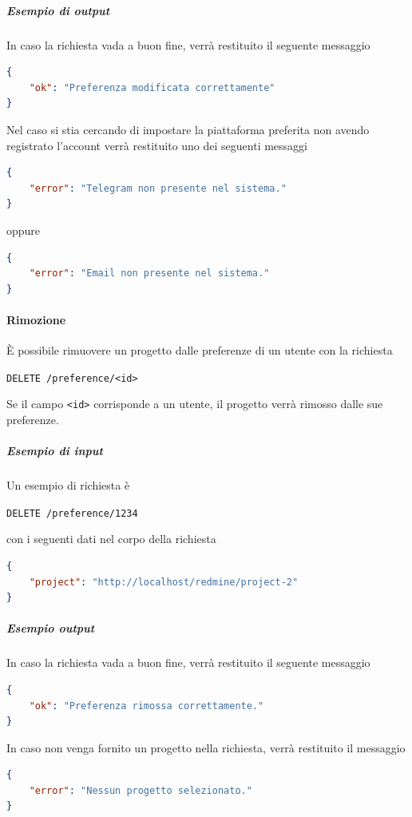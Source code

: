     \subparagraph{Esempio di output}
    In caso la richiesta vada a buon fine, verrà restituito il seguente messaggio
	\begin{lstlisting}[language = json]
{
    "ok": "Preferenza modificata correttamente"
}
	\end{lstlisting}

	Nel caso si stia cercando di impostare la piattaforma preferita non avendo registrato l'account verrà restituito uno dei seguenti messaggi
	\begin{lstlisting}[language = json]
{
    "error": "Telegram non presente nel sistema."
}
	\end{lstlisting}

	oppure

	\begin{lstlisting}[language = json]
{
    "error": "Email non presente nel sistema."
}
	\end{lstlisting}

\paragraph{Rimozione}

È possibile rimuovere un progetto dalle preferenze di un utente con la richiesta
\begin{center}
    \texttt{DELETE /preference/<id>}
\end{center}

Se il campo \texttt{<id>} corrisponde a un utente, il progetto verrà rimosso dalle sue preferenze.

    \subparagraph{Esempio di input}
    Un esempio di richiesta è
    \begin{center}
	    \texttt{DELETE /preference/1234}
    \end{center}
    con i seguenti dati nel corpo della richiesta
	\begin{lstlisting}[language = json]
{
    "project": "http://localhost/redmine/project-2"
}
    \end{lstlisting}

    \subparagraph{Esempio output}
    In caso la richiesta vada a buon fine, verrà restituito il seguente messaggio
    \begin{lstlisting}[language = json]
{
    "ok": "Preferenza rimossa correttamente."
}
    \end{lstlisting}

    In caso non venga fornito un progetto nella richiesta, verrà restituito il messaggio
    \begin{lstlisting}[language = json]
{
    "error": "Nessun progetto selezionato."
}
    \end{lstlisting}

